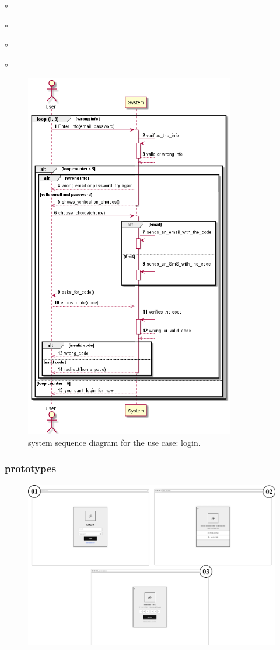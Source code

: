 \documentclass[]{uc2pfecaneva}
\begin{document}
\begin{list}{$\circ$}{}
\begin{list}{$\circ$}{}
\begin{list}{$\circ$}{}
\begin{list}{$\circ$}{}
\begin{figure}[h]
        \centering
        \includegraphics[width=260pt]{images/Login_dss}

        \caption{system sequence diagram for the use case: login.}
    \end{figure}
    \clearpage

    \subsubsection{prototypes}
    \begin{figure}[h]

        \centering
        \includegraphics[width=\textwidth]{images/login}


\end{figure}
\end{list}
\end{list}
\end{list}
\end{list}
\end{document}
